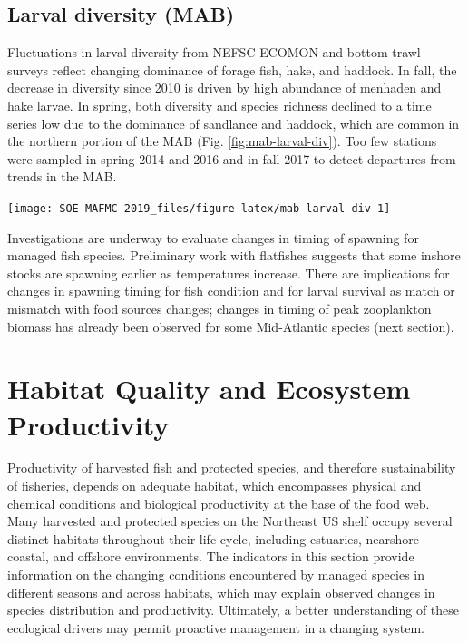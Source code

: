 \documentclass[10pt,]{article}
\let\origfigure\figure
\let\endorigfigure\endfigure
\renewenvironment{figure}[1][2] {
    \expandafter\origfigure\expandafter[H]
} {
    \endorigfigure
}
\begin{document}
\subsection{Larval diversity (MAB)}\label{larval-diversity-mab}

Fluctuations in larval diversity from NEFSC ECOMON and bottom trawl
surveys reflect changing dominance of forage fish, hake, and haddock. In
fall, the decrease in diversity since 2010 is driven by high abundance
of menhaden and hake larvae. In spring, both diversity and species
richness declined to a time series low due to the dominance of sandlance
and haddock, which are common in the northern portion of the MAB (Fig.
\ref{fig:mab-larval-div}). Too few stations were sampled in spring 2014
and 2016 and in fall 2017 to detect departures from trends in the MAB.

\begin{figure}

{\centering \texttt{[image: SOE-MAFMC-2019\_files/figure-latex/mab-larval-div-1]} 

}

\caption{Larval diversity indices from ECOMON surveys in the Mid-Atlantic.}\label{fig:mab-larval-div}
\end{figure}

Investigations are underway to evaluate changes in timing of spawning
for managed fish species. Preliminary work with flatfishes suggests that
some inshore stocks are spawning earlier as temperatures increase. There
are implications for changes in spawning timing for fish condition and
for larval survival as match or mismatch with food sources changes;
changes in timing of peak zooplankton biomass has already been observed
for some Mid-Atlantic species (next section).

\newpage

\section{Habitat Quality and Ecosystem
Productivity}\label{habitat-quality-and-ecosystem-productivity}

Productivity of harvested fish and protected species, and therefore
sustainability of fisheries, depends on adequate habitat, which
encompasses physical and chemical conditions and biological productivity
at the base of the food web. Many harvested and protected species on the
Northeast US shelf occupy several distinct habitats throughout their
life cycle, including estuaries, nearshore coastal, and offshore
environments. The indicators in this section provide information on the
changing conditions encountered by managed species in different seasons
and across habitats, which may explain observed changes in species
distribution and productivity. Ultimately, a better understanding of
these ecological drivers may permit proactive management in a changing
system.
\end{document}
